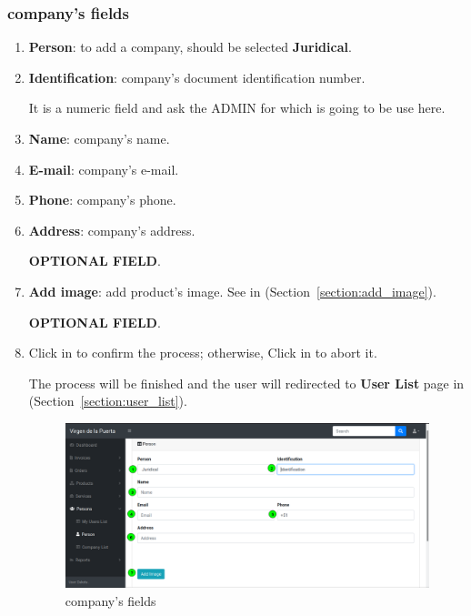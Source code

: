 \documentclass[a4paper,11pt]{refart}
\begin{document}
\subsubsection{company's fields}\label{section:company_form}
\begin{enumerate}
	\item \textbf{Person}: to add a company, should be selected \textbf{Juridical}.
	\item \textbf{Identification}: company's document identification number.
	\medskip
	\begin{leftbar}
		It is a numeric field and ask the ADMIN for which is going to be use here.
	\end{leftbar}
	\item \textbf{Name}: company's name.
	\item \textbf{E-mail}: company's e-mail.
	\item \textbf{Phone}: company's phone.
	\item \textbf{Address}: company's address.
	\medskip
	\begin{leftbar}
		\textbf{OPTIONAL FIELD}.
	\end{leftbar}
	\item \textbf{Add image}: add product's image. See in (Section~\ref{section:add_image}).
	\medskip
	\begin{leftbar}
		\textbf{OPTIONAL FIELD}.
	\end{leftbar}
	\item Click in  to confirm the process; otherwise, Click in  to abort it.
	\medskip
	\begin{leftbar}
		The process will be finished and the user will redirected to \textbf{User List} page in (Section~\ref{section:user_list}).
	\end{leftbar}
	\begin{figure}[H]\centering
		\includegraphics[width=\textwidth]{images/person_form-company-fields.png}
		\caption{company's fields}
		\label{fig:company_form-user-fields}
	\end{figure}
\end{enumerate}
\end{document}
